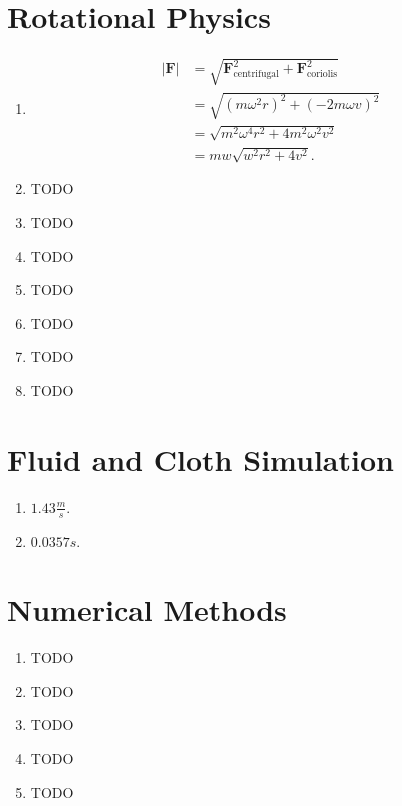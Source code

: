 \documentclass[a4paper]{report}
\begin{document}
\chapter{Rotational Physics}
\begin{enumerate}
	\item
		\begin{align*}
			\lvert \mathbf{F} \rvert
			&= \sqrt{\mathbf{F}_{\text{centrifugal}}^2 + \mathbf{F}_{\text{coriolis}}^2}\\
			&= \sqrt{{(m \omega^2 r)}^2 + {(-2 m \omega v)}^2}\\
			&= \sqrt{m^2 \omega^4 r^2 + 4 m^2 \omega^2 v^2}\\
			&= m w \sqrt{w^2 r^2 + 4 v^2}.
		\end{align*}
	\item TODO
	\item TODO
	\item TODO
	\item TODO
	\item TODO
	\item TODO
	\item TODO
\end{enumerate}

\chapter{Fluid and Cloth Simulation}
\begin{enumerate}
	\item $1.43 \frac{m}{s}$.
	\item $0.0357s$.
\end{enumerate}

\chapter{Numerical Methods}
\begin{enumerate}
	\item TODO
	\item TODO
	\item TODO
	\item TODO
	\item TODO
\end{enumerate}
\end{document}
